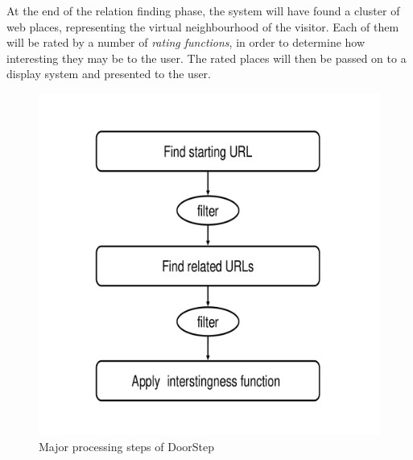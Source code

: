 \documentclass[a4paper,twoside]{danarticle}
\theoremstyle{remark}
\begin{document}
      At the end of the relation finding phase, the system will have found a
      cluster of web places, representing the virtual neighbourhood of the
      visitor. Each of them will be rated by a number of \textit{rating
      functions}, in order to determine how interesting they may be to the user.
      The rated places will then be passed on to a display system and presented  
      to the user.
      \begin{figure}[ht]
        \centering
	\includegraphics[width=12cm]{steps_overview}
	\caption{Major processing steps of DoorStep}
	\label{steps_overview}
      \end{figure}
\end{document}
